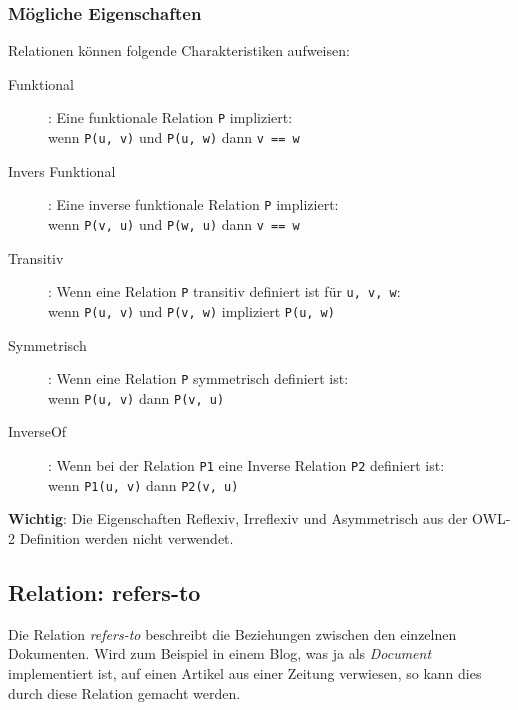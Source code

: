 \documentclass[
    11pt,
    latin1,
    a4paper,
    oneside
]{scrreprt}
\let\oldemph=\emph
\renewcommand{\emph}[1]{\index{#1}\oldemph{#1}}
\begin{document}
\subsubsection{M\"ogliche Eigenschaften} \label{sec:relations_settings}

Relationen k\"onnen folgende Charakteristiken aufweisen:

\begin{description}
  \item[Funktional]: Eine funktionale Relation \texttt{P} impliziert: \\
    wenn \texttt{P(u, v)} und \texttt{P(u, w)} dann \texttt{v == w}
  \item[Invers Funktional]: Eine inverse funktionale Relation \texttt{P} impliziert: \\
    wenn \texttt{P(v, u)} und \texttt{P(w, u)} dann \texttt{v == w}
  \item[Transitiv]: Wenn eine Relation \texttt{P} transitiv definiert ist f\"ur \texttt{u, v, w}: \\
    wenn \texttt{P(u, v)} und \texttt{P(v, w)} impliziert \texttt{P(u, w)}
  \item[Symmetrisch]: Wenn eine Relation \texttt{P} symmetrisch definiert ist: \\
    wenn \texttt{P(u, v)} dann \texttt{P(v, u)}
  \item[InverseOf]: Wenn bei der Relation \texttt{P1} eine Inverse Relation \texttt{P2} definiert ist:\\
    wenn \texttt{P1(u, v)} dann \texttt{P2(v, u)}
\end{description}

\textbf{Wichtig}: Die Eigenschaften Reflexiv, Irreflexiv und Asymmetrisch aus der OWL-2 Definition werden nicht verwendet.


\subsection{Relation: refers-to} \label{sec:rel_refersto}

Die Relation \emph{refers-to} beschreibt die Beziehungen zwischen den einzelnen Dokumenten. Wird zum Beispiel in einem Blog, was ja als \emph{Document} implementiert ist, auf einen Artikel aus einer Zeitung verwiesen, so kann dies durch diese Relation gemacht werden.
\end{document}
